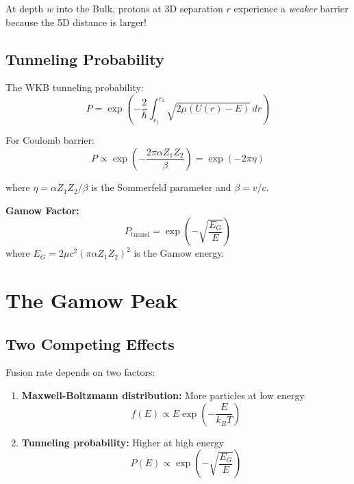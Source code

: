 \documentclass[12pt,a4paper]{article}
\newcommand{\kB}{k_B}
\begin{document}
At depth $w$ into the Bulk, protons at 3D separation $r$ experience a \textit{weaker} barrier because the 5D distance is larger!

\subsection{Tunneling Probability}

The WKB tunneling probability:
\begin{equation}
P = \exp\left(-\frac{2}{\hbar}\int_{r_1}^{r_2} \sqrt{2\mu(U(r) - E)} \, dr\right)
\end{equation}

For Coulomb barrier:
\begin{equation}
P \propto \exp\left(-\frac{2\pi \alpha Z_1 Z_2}{\beta}\right) = \exp(-2\pi\eta)
\end{equation}

where $\eta = \alpha Z_1 Z_2 / \beta$ is the Sommerfeld parameter and $\beta = v/c$.

\begin{keyresult}
\textbf{Gamow Factor:}
\begin{equation}
\boxed{P_{\text{tunnel}} = \exp\left(-\sqrt{\frac{E_G}{E}}\right)}
\end{equation}
where $E_G = 2\mu c^2 (\pi\alpha Z_1 Z_2)^2$ is the Gamow energy.
\end{keyresult}


\section{The Gamow Peak}

\subsection{Two Competing Effects}

Fusion rate depends on two factors:

\begin{enumerate}
    \item \textbf{Maxwell-Boltzmann distribution:} More particles at low energy
    \begin{equation}
    f(E) \propto E \exp\left(-\frac{E}{\kB T}\right)
    \end{equation}
    
    \item \textbf{Tunneling probability:} Higher at high energy
    \begin{equation}
    P(E) \propto \exp\left(-\sqrt{\frac{E_G}{E}}\right)
    \end{equation}
\end{enumerate}
\end{document}
